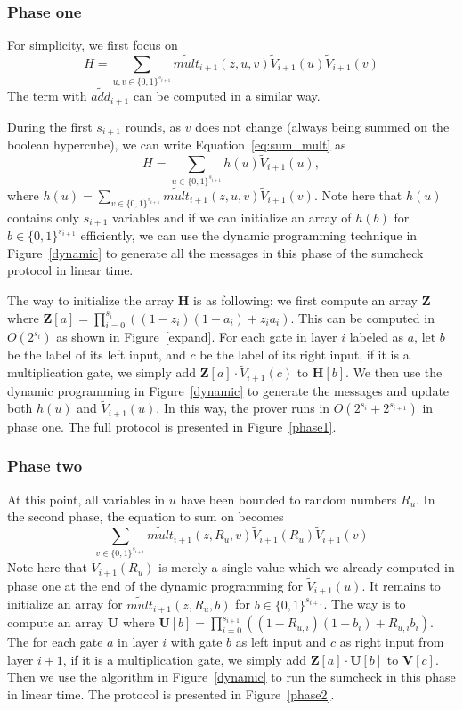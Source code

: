\subsubsection{Phase one}

For simplicity, we first focus on 
\begin{equation}\label{eq:sum_mult}
H = \sum_{u, v \in \{0,1\}^{s_{i+1}}}\tilde{mult}_{i+1}(z,u,v)\tilde{V}_{i+1}(u)\tilde{V}_{i+1}(v)
\end{equation}
The term with $\tilde{add}_{i+1}$ can be computed in a similar way. 

During the first $s_{i+1}$ rounds, as $v$ does not change (always being summed on the boolean hypercube), we can write Equation~\ref{eq:sum_mult} as 
\[
H = \sum_{u\in\{0,1\}^{s_{i+1}}}h(u)\tilde{V}_{i+1}(u),
\]
where $h(u) = \sum_{v\in\{0,1\}^{s_{i+1}}}\tilde{mult}_{i+1}(z,u,v)\tilde{V}_{i+1}(v)$. Note here that $h(u)$ contains only $s_{i+1}$ variables and if we can initialize an array of $h(b)$ for $b\in\{0,1\}^{s_{i+1}}$ efficiently, we can use the dynamic programming technique in Figure~\ref{dynamic} to generate all the messages in this phase of the sumcheck protocol in linear time. 

The way to initialize the array \textbf{H} is as following: we first compute an array \textbf{Z} where $\textbf{Z}[a] = \prod_{i=0}^{s_i} ((1-z_i)(1-a_i)+z_ia_i)$. This can be computed in $O(2^{s_i})$ as shown in Figure~\ref{expand}. For each gate in layer $i$ labeled as $a$, let $b$ be the label of its left input, and $c$ be the label of its right input, if it is a multiplication gate, we simply add $\textbf{Z}[a]\cdot \tilde{V}_{i+1}(c)$ to $\textbf{H}[b]$. We then use the dynamic programming in Figure~\ref{dynamic} to generate the messages and update both $h(u)$ and $\tilde{V}_{i+1}(u)$. In this way, the prover runs in $O(2^{s_i}+2^{s_{i+1}})$ in phase one. The full protocol is presented in Figure~\ref{phase1}.

\subsubsection{Phase two}

At this point, all variables in $u$ have been bounded to random numbers $R_u$. In the second phase, the equation to sum on becomes 
\[
\sum_{v\in\{0,1\}^{s_{i+1}}}\tilde{mult}_{i+1}(z,R_u,v)\tilde{V}_{i+1}(R_u)\tilde{V}_{i+1}(v)
\]
Note here that $\tilde{V}_{i+1}(R_u)$ is merely a single value which we already computed in phase one at the end of the dynamic programming for $\tilde{V}_{i+1}(u)$. It remains to initialize an array for $\tilde{mult}_{i+1}(z,R_u,b)$ for $b\in\{0,1\}^{s_{i+1}}$. The way is to compute an array \textbf{U} where $\textbf{U}[b] = \prod_{i=0}^{s_{i+1}} ((1-R_{u,i})(1-b_i)+R_{u,i}b_i)$. The for each gate $a$ in layer $i$ with gate $b$ as left input and $c$ as right input from layer $i+1$, if it is a multiplication gate, we simply add $\textbf{Z}[a]\cdot\textbf{U}[b]$ to $\textbf{V}[c]$. Then we use the algorithm in Figure~\ref{dynamic} to run the sumcheck in this phase in linear time. The protocol is presented in Figure~\ref{phase2}.

